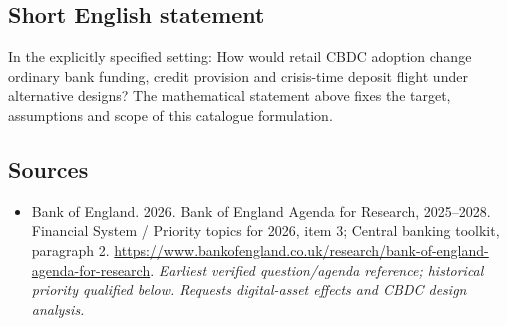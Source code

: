 \documentclass[11pt]{article}
\begin{document}
\subsection{Short English statement}
In the explicitly specified setting: How would retail CBDC adoption change ordinary bank funding, credit provision and crisis-time deposit flight under alternative designs? The mathematical statement above fixes the target, assumptions and scope of this catalogue formulation.

\subsection{Sources}
\begin{itemize}\raggedright
\item[\textnormal{[S1]}]\hypertarget{source:30007611:1}{} Bank of England. 2026. Bank of England Agenda for Research, 2025–2028. Financial System / Priority topics for 2026, item 3; Central banking toolkit, paragraph 2.
\url{https://www.bankofengland.co.uk/research/bank-of-england-agenda-for-research}.
{\small\textit{Earliest verified question/agenda reference; historical priority qualified below. Requests digital-asset effects and CBDC design analysis.}}
\end{itemize}
\end{document}
